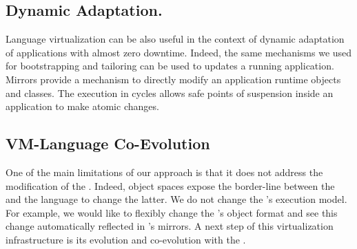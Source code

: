 \subsection{Dynamic Adaptation.} Language virtualization can be also useful in the context of dynamic adaptation of applications with almost zero downtime. Indeed, the same mechanisms we used for bootstrapping and tailoring can be used to updates a running application. Mirrors provide a mechanism to directly modify an application runtime objects and classes. The execution in cycles allows safe points of suspension inside an application to make atomic changes.

\subsection{VM-Language Co-Evolution} One of the main limitations of our approach is that it does not address the modification of the \VM. Indeed, object spaces expose the border-line between the \VM and the language to change the latter. We do not change the \VM's execution model. For example, we would like to flexibly change the \VM's object format and see this change automatically reflected in \Vtt's mirrors. A next step of this virtualization infrastructure is its evolution and co-evolution with the \VM.

%
%
%
%
%
%

